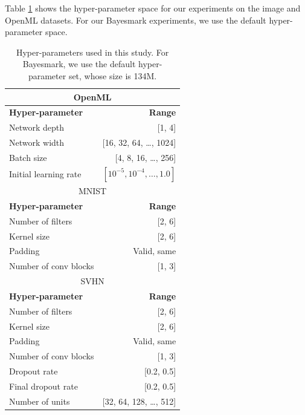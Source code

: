 
Table \ref{tab:hpo_space} shows the hyper-parameter space for our experiments on the image and OpenML datasets. For our Bayesmark experiments, we use the default hyper-parameter space.

\begin{table}[t]
    \centering
    \small
    \caption{Hyper-parameters used in this study. For Bayesmark, we use the default hyper-parameter set, whose size is 134M.}
    \label{tab:hpo_space}
    \begin{tabular}{lr}
        \toprule
        \multicolumn{2}{c}{OpenML} \\
        \midrule
        \textbf{Hyper-parameter} & \textbf{Range} \\
        \midrule
        Network depth & [1, 4] \\
        Network width & [16, 32, 64, \ldots, 1024] \\
        Batch size & [4, 8, 16, \ldots, 256] \\
        Initial learning rate & $[10^{-5}, 10^{-4}, \ldots, 1.0]$ \\
        \midrule
        \multicolumn{2}{c}{MNIST} \\
        \midrule
        \textbf{Hyper-parameter} & \textbf{Range} \\
        \midrule
        Number of filters & [2, 6] \\
        Kernel size & [2, 6] \\
        Padding & Valid, same \\
        Number of conv blocks & [1, 3] \\
        \midrule
        \multicolumn{2}{c}{SVHN} \\
        \midrule
        \textbf{Hyper-parameter} & \textbf{Range} \\
        \midrule
        Number of filters & [2, 6] \\
        Kernel size & [2, 6] \\
        Padding & Valid, same \\
        Number of conv blocks & [1, 3] \\
        Dropout rate & [0.2, 0.5] \\
        Final dropout rate & [0.2, 0.5] \\
        Number of units & [32, 64, 128, \ldots, 512] \\
        \bottomrule
    \end{tabular}
\end{table}